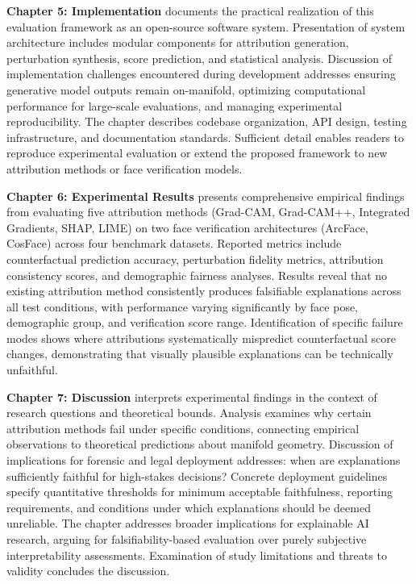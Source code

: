 \textbf{Chapter 5: Implementation} documents the practical realization of this evaluation framework as an open-source software system. Presentation of system architecture includes modular components for attribution generation, perturbation synthesis, score prediction, and statistical analysis. Discussion of implementation challenges encountered during development addresses ensuring generative model outputs remain on-manifold, optimizing computational performance for large-scale evaluations, and managing experimental reproducibility. The chapter describes codebase organization, API design, testing infrastructure, and documentation standards. Sufficient detail enables readers to reproduce experimental evaluation or extend the proposed framework to new attribution methods or face verification models.

\textbf{Chapter 6: Experimental Results} presents comprehensive empirical findings from evaluating five attribution methods (Grad-CAM, Grad-CAM++, Integrated Gradients, SHAP, LIME) on two face verification architectures (ArcFace, CosFace) across four benchmark datasets. Reported metrics include counterfactual prediction accuracy, perturbation fidelity metrics, attribution consistency scores, and demographic fairness analyses. Results reveal that no existing attribution method consistently produces falsifiable explanations across all test conditions, with performance varying significantly by face pose, demographic group, and verification score range. Identification of specific failure modes shows where attributions systematically mispredict counterfactual score changes, demonstrating that visually plausible explanations can be technically unfaithful.

\textbf{Chapter 7: Discussion} interprets experimental findings in the context of research questions and theoretical bounds. Analysis examines why certain attribution methods fail under specific conditions, connecting empirical observations to theoretical predictions about manifold geometry. Discussion of implications for forensic and legal deployment addresses: when are explanations sufficiently faithful for high-stakes decisions? Concrete deployment guidelines specify quantitative thresholds for minimum acceptable faithfulness, reporting requirements, and conditions under which explanations should be deemed unreliable. The chapter addresses broader implications for explainable AI research, arguing for falsifiability-based evaluation over purely subjective interpretability assessments. Examination of study limitations and threats to validity concludes the discussion.

